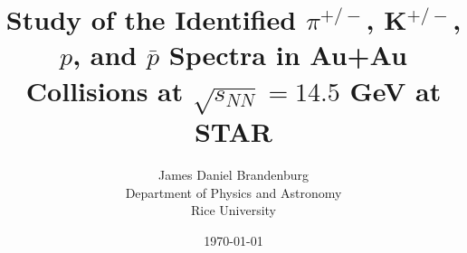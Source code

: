 \documentclass[12pt]{article}
\title{ Study of the Identified $\pi^{+/-}$, K$^{+/-}$, $p$, and $\bar{p}$ Spectra in Au+Au Collisions at $\sqrt{s_{NN}}=14.5$ GeV at STAR }
\author{
        James Daniel Brandenburg \\
        Department of Physics and Astronomy\\
        Rice University
}
\date{\today}
\begin{document}
	\maketitle


	\clearpage
	\tableofcontents
	\clearpage

	
	
	



	
	\clearpage
	\singlespacing
	\footnotesize
	
	
\end{document}

